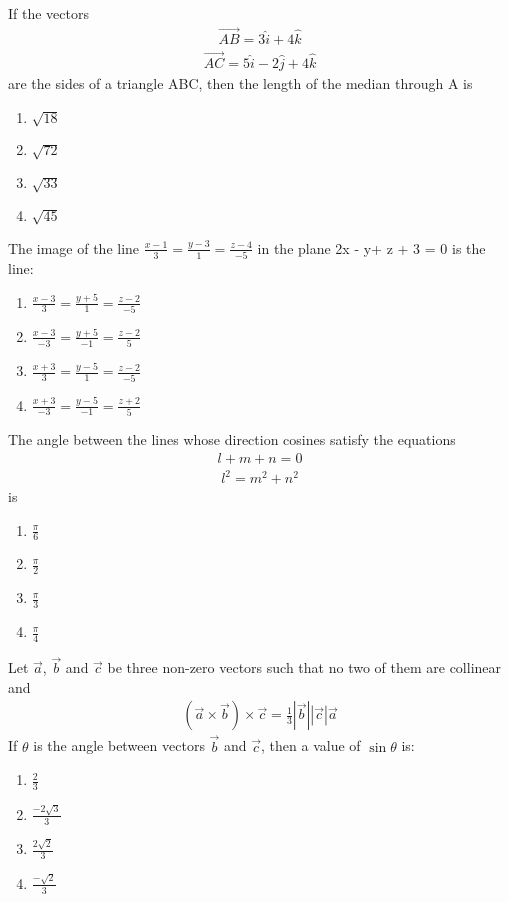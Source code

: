 \item If the vectors 
\begin{align*}
\overrightarrow{AB} = 3\hat{i} + 4\hat{k}
\end{align*}
\begin{align*}
\overrightarrow{AC} = 5\hat{i} - 2\hat{j} + 4\hat{k}
\end{align*}
are the sides of a triangle ABC, then the length of the median through A is
\begin{enumerate}
\item $\sqrt{18}$
\item $\sqrt{72}$
\item $\sqrt{33}$
\item $\sqrt{45}$
\end{enumerate}

\item The image of the line $\frac{x-1}{3} = \frac{y-3}{1} = \frac{z-4}{-5}$ in the plane 2x - y+ z + 3 = 0 is the line:
\begin{enumerate}
\item $\frac{x-3}{3} = \frac{y+5}{1} = \frac{z-2}{-5}$
\item $\frac{x-3}{-3} = \frac{y+5}{-1} = \frac{z-2}{5}$
\item $\frac{x+3}{3} = \frac{y-5}{1} = \frac{z-2}{-5}$
\item $\frac{x+3}{-3} = \frac{y-5}{-1} = \frac{z+2}{5}$ 
\end{enumerate}

\item The angle between the lines whose direction cosines satisfy the equations
\begin{align*}
l + m + n = 0
\end{align*}
\begin{align*}
l^2 = m^2 + n^2
\end{align*}
is
\begin{enumerate}
\item $\frac{\pi}{6}$
\item $\frac{\pi}{2}$
\item $\frac{\pi}{3}$
\item $\frac{\pi}{4}$
\end{enumerate}

\item Let $\overrightarrow{a}$, $\overrightarrow{b}$ and $\overrightarrow{c}$ be three non-zero vectors such that no two of them are collinear and 
\begin{align*}
(\overrightarrow{a} \times \overrightarrow{b}) \times \overrightarrow{c} = \frac{1}{3}|\overrightarrow{b}||\overrightarrow{c}|\overrightarrow{a}
\end{align*}
If $\theta$ is the angle between vectors $\overrightarrow{b}$ and $\overrightarrow{c}$, then a value of $\sin\theta$ is:
\begin{enumerate}
\item $\frac{2}{3}$
\item $\frac{-2\sqrt{3}}{3}$
\item $\frac{2\sqrt{2}}{3}$
\item $\frac{-\sqrt{2}}{3}$
\end{enumerate}

